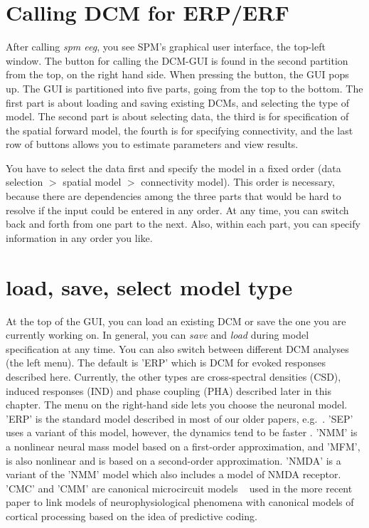 \section{Calling DCM for ERP/ERF}
After calling \textit{spm eeg}, you see SPM's graphical user interface,
the top-left window. The button for calling the DCM-GUI is found
in the second partition from the top, on the right hand side. When
pressing the button, the GUI pops up. The GUI is partitioned into five
parts, going from the top to the bottom. The first part is about
loading and saving existing DCMs, and selecting the type of model. The second part is about selecting
data, the third is for specification of the spatial forward model, the
fourth is for specifying connectivity, and the last row of
buttons allows you to estimate parameters and view results.

You have to select the data first and specify the model in
a fixed order (data selection $>$ spatial model $>$
connectivity model). This order is necessary, because there are
dependencies among the three parts that would be hard to resolve
if the input could be entered in any order. At any time, you can switch back and forth from one part to
the next. Also, within each part, you can specify information in any
order you like.

\section{load, save, select model type}
At the top of the GUI, you can load an existing DCM or save the one
you are currently working on. In general, you can \textit{save} and
\textit{load} during model specification at any time. You can also
switch between different DCM analyses (the left menu). The default is 'ERP' which is DCM
for evoked responses described here. Currently, the other types are cross-spectral densities (CSD), induced responses (IND) and phase coupling (PHA) described later in this chapter. The menu on the right-hand side lets you choose the neuronal model.   'ERP'  is the standard model described in most of our older papers, e.g.~\cite{od_dcm_erp}.  'SEP' uses a variant of this model, however, the dynamics tend to be faster \cite{andre_sigmoid}. 'NMM' is a nonlinear neural mass model based on a first-order approximation, and  'MFM', is also nonlinear and is based on a second-order approximation. 'NMDA' is a variant of the 'NMM' model which also includes a model of NMDA receptor. 'CMC' and 'CMM'  are canonical microcircuit models ~\cite{bastos_neuron} used in the more recent paper to link models of neurophysiological phenomena with canonical models of cortical processing based on the idea of predictive coding. 

